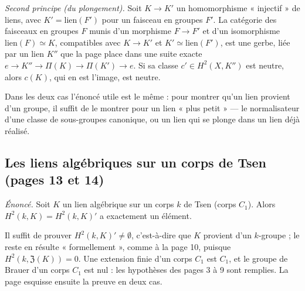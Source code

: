 \documentclass[11pt,a4paper]{article}
\begin{document}
\emph{Second principe (du plongement).} Soit $K \to K'$ un homomorphisme
« injectif » de liens, avec $K' = \mathrm{lien}(F')$ pour un faisceau en groupes
$F'$. La catégorie des faisceaux en groupes $F$ munis d'un morphisme $F \to F'$
et d'un isomorphisme $\mathrm{lien}(F) \simeq K$, compatibles avec $K \to K'$ et
$K' \simeq \mathrm{lien}(F')$, est une gerbe, liée par un lien $K''$ que la page
place dans une suite exacte $e \to K'' \to \Pi(K) \to \Pi(K') \to e$. Si sa
classe $c' \in H^2(X,K'')$ est neutre, alors $c(K)$, qui en est l'image, est
neutre.

Dans les deux cas l'énoncé utile est le même : pour montrer qu'un lien provient
d'un groupe, il suffit de le montrer pour un lien « plus petit » — le
normalisateur d'une classe de sous-groupes canonique, ou un lien qui se plonge
dans un lien déjà réalisé.

\subsection*{Les liens algébriques sur un corps de Tsen (pages 13 et 14)}

\emph{Énoncé.} Soit $K$ un lien algébrique sur un corps $k$ de Tsen (corps
$C_1$). Alors $H^2(k,K) = H^2(k,K)'$ a exactement un élément.

Il suffit de prouver $H^2(k,K)' \neq \emptyset$, c'est-à-dire que $K$ provient
d'un $k$-groupe ; le reste en résulte « formellement », comme à la page 10,
puisque $H^2(k,\mathfrak{Z}(K)) = 0$. Une extension finie d'un corps $C_1$ est
$C_1$, et le groupe de Brauer d'un corps $C_1$ est nul : les hypothèses des pages
3 à 9 sont remplies. La page esquisse ensuite la preuve en deux cas.
\end{document}

